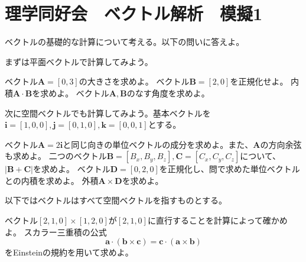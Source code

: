 \documentclass[a4j,dvipdfmx]{jsarticle}
\begin{document}
    \part*{理学同好会　ベクトル解析　模擬1}
        ベクトルの基礎的な計算について考える。以下の問いに答えよ。
        \begin{qparts}
            \qpart まずは平面ベクトルで計算してみよう。
            \begin{qlist}
                \qitem ベクトル$\bm{A}=[0,3]$の大きさを求めよ。
                \qitem ベクトル$\bm{B}=[2,0]$を正規化せよ。
                \qitem 内積$\bm{A}\cdot \bm{B}$を求めよ。
                \qitem ベクトル$\bm{A},\bm{B}$のなす角度を求めよ。
            \end{qlist}
            \qpart 次に空間ベクトルでも計算してみよう。基本ベクトルを$\bm{i}=[1,0,0],\bm{j}=[0,1,0],\bm{k}=[0,0,1]$とする。
            \begin{qlist}
                \qitem ベクトル$\bm{A}=2\bm{i}$と同じ向きの単位ベクトルの成分を求めよ。また、$\bm{A}$の方向余弦も求めよ。\label{q:1ii5}
                \qitem 二つのベクトル$\bm{B}=[B_x,B_y,B_z],\bm{C}=[C_x,C_y,C_z]$について、$|\bm{B}+\bm{C}|$を求めよ。
                \qitem ベクトル$\bm{D}=[0,2,0]$を正規化し、問で求めた単位ベクトルとの内積を求めよ。
                \qitem 外積$\bm{A}\times \bm{D}$を求めよ。
            \end{qlist}
            \qpart 以下ではベクトルはすべて空間ベクトルを指すものとする。
            \begin{qlist}
                \qitem ベクトル$[2,1,0]\times [1,2,0]$が$[2,1,0]$に直行することを計算によって確かめよ。
                \qitem スカラー三重積の公式
                \begin{equation}
                    \bm{a}\cdot(\bm{b}\times\bm{c}) = \bm{c}\cdot(\bm{a}\times\bm{b})
                \end{equation}
                をEinsteinの規約を用いて求めよ。
            \end{qlist}
        \end{qparts}
\end{document}
